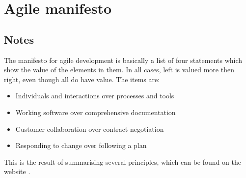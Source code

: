 \chapter{Agile manifesto \cite{agilemanifesto}}
\section{Notes}
The manifesto for agile development is basically a list of four statements which show the value of the elements in them. 
In all cases, left is valued more then right, even though all do have value.
The items are:
\begin{itemize}
  \item Individuals and interactions over processes and tools
  \item Working software over comprehensive documentation
  \item Customer collaboration over contract negotiation
  \item Responding to change over following a plan
\end{itemize}

This is the result of summarising several principles, which can be found on the website \cite{agilemanifesto}.

